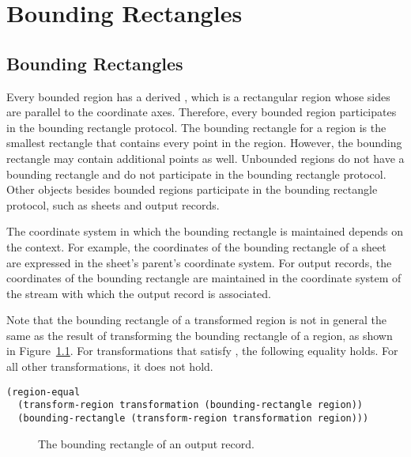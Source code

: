 
\chapter {Bounding Rectangles}
\label {bboxes}

\section {Bounding Rectangles}

Every bounded region has a derived , which is a
rectangular region whose sides are parallel to the coordinate axes.  Therefore,
every bounded region participates in the bounding rectangle protocol.  The
bounding rectangle for a region is the smallest rectangle that contains every
point in the region.  However, the bounding rectangle may contain additional
points as well.  Unbounded regions do not have a bounding rectangle and do not
participate in the bounding rectangle protocol.  Other objects besides bounded
regions participate in the bounding rectangle protocol, such as sheets and
output records.

The coordinate system in which the bounding rectangle is maintained depends on
the context.  For example, the coordinates of the bounding rectangle of a sheet
are expressed in the sheet's parent's coordinate system.  For output records,
the coordinates of the bounding rectangle are maintained in the coordinate
system of the stream with which the output record is associated.

Note that the bounding rectangle of a transformed region is not in general the
same as the result of transforming the bounding rectangle of a region, as shown
in Figure~\ref{output-record-bbox}.  For transformations that satisfy
, the following equality holds.  For all other
transformations, it does not hold.

\begin{verbatim}
(region-equal
  (transform-region transformation (bounding-rectangle region))
  (bounding-rectangle (transform-region transformation region)))
\end{verbatim}

\begin{figure}
\centerline{}
\caption{\label{output-record-bbox} The bounding rectangle of an output record.}
\end{figure}

